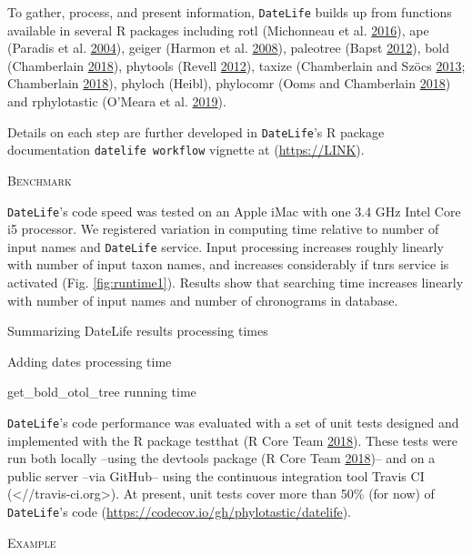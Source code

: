 \documentclass[]{article}
\begin{document}
To gather, process, and present information, \texttt{DateLife} builds up from functions
available in several R packages including rotl (Michonneau et al. \protect\hyperlink{ref-Michonneau2016}{2016}), ape (Paradis et al. \protect\hyperlink{ref-Paradis2004}{2004}),
geiger (Harmon et al. \protect\hyperlink{ref-Harmon2008}{2008}), paleotree (Bapst \protect\hyperlink{ref-Bapst2012a}{2012}), bold (Chamberlain \protect\hyperlink{ref-Chamberlain2018}{2018}), phytools (Revell \protect\hyperlink{ref-Revell2012}{2012}),
taxize (Chamberlain and Szöcs \protect\hyperlink{ref-Chamberlain2013}{2013}; Chamberlain \protect\hyperlink{ref-Chamberlain2018}{2018}), phyloch (Heibl), phylocomr (Ooms and Chamberlain \protect\hyperlink{ref-Ooms2018}{2018})
and rphylotastic (O'Meara et al. \protect\hyperlink{ref-Omeara2019}{2019}).

Details on each step are further developed in \texttt{DateLife}'s R package documentation
\texttt{datelife\ workflow} vignette at (\url{https://LINK}).

\begin{center}
\textsc{Benchmark}
\end{center}

\texttt{DateLife}'s code speed was tested on an Apple iMac
with one 3.4 GHz Intel Core i5 processor.
We registered variation in computing time relative to number of input names
and \texttt{DateLife} service.
Input processing increases roughly linearly with number of input taxon names, and
increases considerably if tnrs service is activated (Fig. \ref{fig:runtime1}).
Results show that searching time increases linearly with number of input names and
number of chronograms in database.

Summarizing DateLife results processing times

Adding dates processing time

get\_bold\_otol\_tree running time

\texttt{DateLife}'s code performance was evaluated with a set of unit tests designed and
implemented with the R package testthat (R Core Team \protect\hyperlink{ref-RCoreTeam2018}{2018}). These tests were run both
locally --using the devtools package (R Core Team \protect\hyperlink{ref-RCoreTeam2018}{2018})-- and on a public server --via
GitHub-- using the continuous integration tool Travis CI (\textless{}//travis-ci.org\textgreater{}). At
present, unit tests cover more than 50\% (for now) of \texttt{DateLife}'s code (\url{https://codecov.io/gh/phylotastic/datelife}).

\begin{center}
\textsc{Example}
\end{center}
\end{document}

